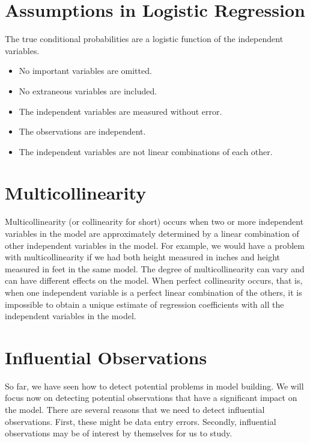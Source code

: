 \documentclass[a4paper,12pt]{article}
\begin{document}
\tableofcontents
\section{Assumptions in Logistic Regression}

The true conditional probabilities are a logistic function of the independent variables.
\begin{itemize}
\item No important variables are omitted.
\item No extraneous variables are included.
\item The independent variables are measured without error.
\item The observations are independent.
\item The independent variables are not linear combinations of each other.
\end{itemize}
\section{Multicollinearity}

Multicollinearity (or collinearity for short) occurs when two or more independent variables in the model are approximately determined by a linear combination of other independent variables in the model. For example, we would have a problem with multicollinearity if we had both height measured in inches and height measured in feet in the same model. The degree of multicollinearity can vary and can have different effects on the model. When perfect collinearity occurs, that is, when one independent variable is a perfect linear combination of the others, it is impossible to obtain a unique estimate of regression coefficients with all the independent variables in the model.

\section{Influential Observations}

So far, we have seen how to detect potential problems in model building. We will focus now on detecting potential observations that have a significant impact on the model. There are several reasons that we need to detect influential observations. First, these might be data entry errors. Secondly, influential observations may be of interest by themselves for us to study. 
\end{document}
